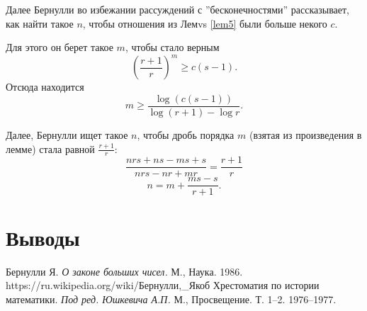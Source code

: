 \documentclass[12pt]{article}
\begin{document}
Далее Бернулли во избежании рассуждений с ''бесконечностями'' рассказывает, как найти такое $n$, чтобы отношения из Лемvs \ref{lem5} были больше некого $c$.

Для этого он берет такое $m$, чтобы стало верным 
$$\left(\frac{r+1}{r}\right)^m \geqslant c (s-1).$$
Отсюда находится $$m \geqslant \frac{\log (c(s-1))}{\log (r+1) - \log r}.$$

Далее, Бернулли ищет такое $n$, чтобы дробь порядка $m$ (взятая из произведения в лемме) стала равной $\frac{r+1}{r}$:
$$\frac{nrs+ns-ms+s}{nrs-nr+mr} = \frac{r+1}{r}$$ 
$$n = m + \frac{ms-s}{r+1}.$$


\newpage
\section{Выводы}

\newpage
\begin{thebibliography}{99}
 Бернулли Я. \textit{О законе больших чисел.} М., Наука. 1986.
 https://ru.wikipedia.org/wiki/Бернулли,\_Якоб
 Хрестоматия по истории математики. \textit{Под ред. Юшкевича А.П.} М., Просвещение. Т. 1–2. 1976–1977.

\end{thebibliography}
\end{document}
